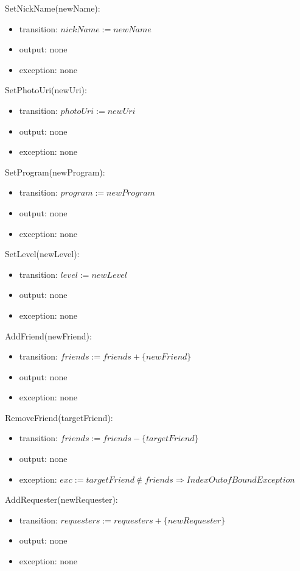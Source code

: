 \documentclass[12pt, titlepage]{article}
\begin{document}
\noindent SetNickName(newName):
\begin{itemize}
\item transition: $nickName := newName$
\item output: none
\item exception: none
\end{itemize}

\noindent SetPhotoUri(newUri):
\begin{itemize}
\item transition: $photoUri := newUri$
\item output: none
\item exception: none
\end{itemize}

\noindent SetProgram(newProgram):
\begin{itemize}
\item transition: $program := newProgram$
\item output: none
\item exception: none
\end{itemize}

\noindent SetLevel(newLevel):
\begin{itemize}
\item transition: $level := newLevel$
\item output: none
\item exception: none
\end{itemize}

\noindent AddFriend(newFriend):
\begin{itemize}
\item transition: $friends := friends + \{newFriend\}$
\item output: none
\item exception: none
\end{itemize}

\noindent RemoveFriend(targetFriend):
\begin{itemize}
\item transition: $friends := friends - \{targetFriend\}$
\item output: none
\item exception: $exc := targetFriend \notin friends \Rightarrow IndexOutofBound Exception$
\end{itemize}

\noindent AddRequester(newRequester):
\begin{itemize}
\item transition: $requesters := requesters + \{newRequester\}$
\item output: none
\item exception: none
\end{itemize}
\end{document}
